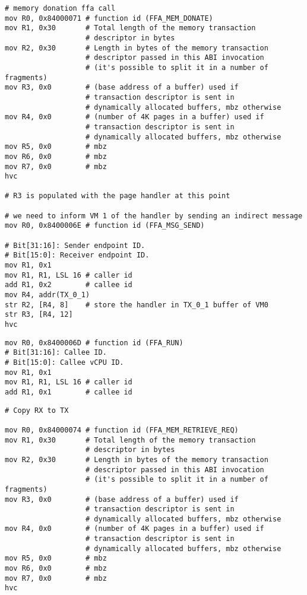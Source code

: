 \documentclass{article}
\begin{document}
\begin{lstlisting}[caption={VM 1}]
# memory donation ffa call
mov R0, 0x84000071 # function id (FFA_MEM_DONATE)
mov R1, 0x30       # Total length of the memory transaction 
                   # descriptor in bytes
mov R2, 0x30       # Length in bytes of the memory transaction 
                   # descriptor passed in this ABI invocation
                   # (it's possible to split it in a number of fragments)
mov R3, 0x0        # (base address of a buffer) used if 
                   # transaction descriptor is sent in 
                   # dynamically allocated buffers, mbz otherwise
mov R4, 0x0        # (number of 4K pages in a buffer) used if 
                   # transaction descriptor is sent in 
                   # dynamically allocated buffers, mbz otherwise
mov R5, 0x0        # mbz
mov R6, 0x0        # mbz
mov R7, 0x0        # mbz
hvc

# R3 is populated with the page handler at this point

# we need to inform VM 1 of the handler by sending an indirect message
mov R0, 0x8400006E # function id (FFA_MSG_SEND)

# Bit[31:16]: Sender endpoint ID.
# Bit[15:0]: Receiver endpoint ID.
mov R1, 0x1
mov R1, R1, LSL 16 # caller id
add R1, 0x2        # callee id
mov R4, addr(TX_0_1)
str R2, [R4, 8]    # store the handler in TX_0_1 buffer of VM0
str R3, [R4, 12]
hvc
\end{lstlisting}

\begin{lstlisting}[caption={VM 0}]
mov R0, 0x8400006D # function id (FFA_RUN)
# Bit[31:16]: Callee ID.
# Bit[15:0]: Callee vCPU ID.
mov R1, 0x1
mov R1, R1, LSL 16 # caller id
add R1, 0x1        # callee id
\end{lstlisting}

\begin{lstlisting}[caption={VM 2}]
# Copy RX to TX

mov R0, 0x84000074 # function id (FFA_MEM_RETRIEVE_REQ)
mov R1, 0x30       # Total length of the memory transaction 
                   # descriptor in bytes
mov R2, 0x30       # Length in bytes of the memory transaction 
                   # descriptor passed in this ABI invocation
                   # (it's possible to split it in a number of fragments)
mov R3, 0x0        # (base address of a buffer) used if 
                   # transaction descriptor is sent in 
                   # dynamically allocated buffers, mbz otherwise
mov R4, 0x0        # (number of 4K pages in a buffer) used if 
                   # transaction descriptor is sent in 
                   # dynamically allocated buffers, mbz otherwise
mov R5, 0x0        # mbz
mov R6, 0x0        # mbz
mov R7, 0x0        # mbz
hvc
\end{lstlisting}
\end{document}
